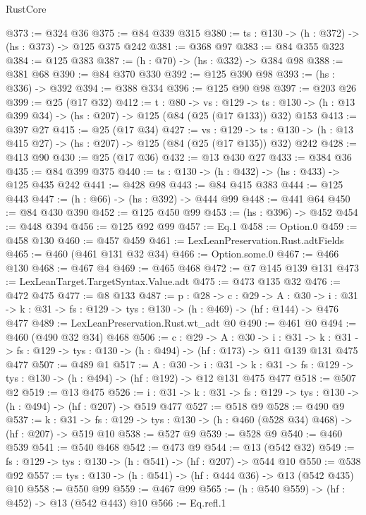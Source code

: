 \begin{lexlean}{RustCore}
\begin{coremodule}
@373 := @324 @36
@375 := @84 @339 @315
@380 := {ts : @130} -> (h : @372) -> (hs : @373) -> @125 @375 @242
@381 := @368 @97
@383 := @84 @355 @323
@384 := @125 @383
@387 := (h : @70) -> (hs : @332) -> @384 @98
@388 := @381 @68
@390 := @84 @370 @330
@392 := @125 @390 @98
@393 := (hs : @336) -> @392
@394 := @388 @334
@396 := @125 @90 @98
@397 := @203 @26
@399 := @25 (@17 @32)
@412 := {t : @80} ->
  {vs : @129} ->
  {ts : @130} -> (h : @13 @399 @34) -> (hs : @207) -> @125 (@84 (@25 (@17 @133)) @32) @153
@413 := @397 @27
@415 := @25 (@17 @34)
@427 := {vs : @129} ->
  {ts : @130} -> (h : @13 @415 @27) -> (hs : @207) -> @125 (@84 (@25 (@17 @135)) @32) @242
@428 := @413 @90
@430 := @25 (@17 @36)
@432 := @13 @430 @27
@433 := @384 @36
@435 := @84 @399 @375
@440 := {ts : @130} -> (h : @432) -> (hs : @433) -> @125 @435 @242
@441 := @428 @98
@443 := @84 @415 @383
@444 := @125 @443
@447 := (h : @66) -> (hs : @392) -> @444 @99
@448 := @441 @64
@450 := @84 @430 @390
@452 := @125 @450 @99
@453 := (hs : @396) -> @452
@454 := @448 @394
@456 := @125 @92 @99
@457 := Eq.{1}
@458 := Option.{0}
@459 := @458 @130
@460 := @457 @459
@461 := LexLeanPreservation.Rust.adtFields
@465 := @460 (@461 @131 @32 @34)
@466 := Option.some.{0}
@467 := @466 @130
@468 := @467 @4
@469 := @465 @468
@472 := @7 @145 @139 @131
@473 := LexLeanTarget.TargetSyntax.Value.adt
@475 := @473 @135 @32
@476 := @472 @475
@477 := @8 @133
@487 := {p : @28} ->
  {c : @29} ->
  {A : @30} ->
  {i : @31} -> {k : @31} -> {fs : @129} -> {tys : @130} -> (h : @469) -> (hf : @144) -> @476 @477
@489 := LexLeanPreservation.Rust.wt_adt @0
@490 := @461 @0
@494 := @460 (@490 @32 @34) @468
@506 := {c : @29} ->
  {A : @30} ->
  {i : @31} ->
  {k : @31} -> {fs : @129} -> {tys : @130} -> (h : @494) -> (hf : @173) -> @11 @139 @131 @475 @477
@507 := @489 @1
@517 := {A : @30} ->
  {i : @31} ->
  {k : @31} -> {fs : @129} -> {tys : @130} -> (h : @494) -> (hf : @192) -> @12 @131 @475 @477
@518 := @507 @2
@519 := @13 @475
@526 := {i : @31} ->
  {k : @31} -> {fs : @129} -> {tys : @130} -> (h : @494) -> (hf : @207) -> @519 @477
@527 := @518 @9
@528 := @490 @9
@537 := {k : @31} ->
  {fs : @129} -> {tys : @130} -> (h : @460 (@528 @34) @468) -> (hf : @207) -> @519 @10
@538 := @527 @9
@539 := @528 @9
@540 := @460 @539
@541 := @540 @468
@542 := @473 @9
@544 := @13 (@542 @32)
@549 := {fs : @129} -> {tys : @130} -> (h : @541) -> (hf : @207) -> @544 @10
@550 := @538 @92
@557 := {tys : @130} -> (h : @541) -> (hf : @444 @36) -> @13 (@542 @435) @10
@558 := @550 @99
@559 := @467 @99
@565 := (h : @540 @559) -> (hf : @452) -> @13 (@542 @443) @10
@566 := Eq.refl.{1}

\end{coremodule}
\end{lexlean}
